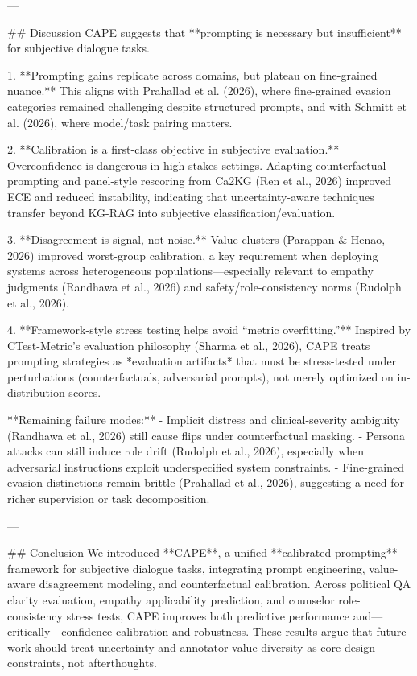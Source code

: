---

## Discussion  
CAPE suggests that **prompting is necessary but insufficient** for subjective dialogue tasks.

1. **Prompting gains replicate across domains, but plateau on fine-grained nuance.** This aligns with Prahallad et al. (2026), where fine-grained evasion categories remained challenging despite structured prompts, and with Schmitt et al. (2026), where model/task pairing matters.

2. **Calibration is a first-class objective in subjective evaluation.** Overconfidence is dangerous in high-stakes settings. Adapting counterfactual prompting and panel-style rescoring from Ca2KG (Ren et al., 2026) improved ECE and reduced instability, indicating that uncertainty-aware techniques transfer beyond KG-RAG into subjective classification/evaluation.

3. **Disagreement is signal, not noise.** Value clusters (Parappan & Henao, 2026) improved worst-group calibration, a key requirement when deploying systems across heterogeneous populations—especially relevant to empathy judgments (Randhawa et al., 2026) and safety/role-consistency norms (Rudolph et al., 2026).

4. **Framework-style stress testing helps avoid “metric overfitting.”** Inspired by CTest-Metric’s evaluation philosophy (Sharma et al., 2026), CAPE treats prompting strategies as *evaluation artifacts* that must be stress-tested under perturbations (counterfactuals, adversarial prompts), not merely optimized on in-distribution scores.

**Remaining failure modes:**  
- Implicit distress and clinical-severity ambiguity (Randhawa et al., 2026) still cause flips under counterfactual masking.  
- Persona attacks can still induce role drift (Rudolph et al., 2026), especially when adversarial instructions exploit underspecified system constraints.  
- Fine-grained evasion distinctions remain brittle (Prahallad et al., 2026), suggesting a need for richer supervision or task decomposition.

---

## Conclusion  
We introduced **CAPE**, a unified **calibrated prompting** framework for subjective dialogue tasks, integrating prompt engineering, value-aware disagreement modeling, and counterfactual calibration. Across political QA clarity evaluation, empathy applicability prediction, and counselor role-consistency stress tests, CAPE improves both predictive performance and—critically—confidence calibration and robustness. These results argue that future work should treat uncertainty and annotator value diversity as core design constraints, not afterthoughts.

